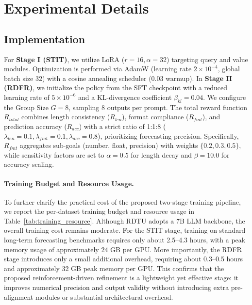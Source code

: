 \section{Experimental Details}\label{appx:implementation}

\subsection{Implementation}

For \textbf{Stage I (STIT)}, we utilize LoRA ($r=16, \alpha=32$) targeting query and value modules. Optimization is performed via AdamW (learning rate $2\times 10^{-4}$, global batch size 32) with a cosine annealing scheduler (0.03 warmup). In \textbf{Stage II (RDFR)}, we initialize the policy from the SFT checkpoint with a reduced learning rate of $5\times 10^{-6}$ and a KL-divergence coefficient $\beta_{kl}=0.04$. We configure the Group Size $G=8$, sampling 8 outputs per prompt. The total reward function $R_{total}$ combines length consistency ($R_{len}$), format compliance ($R_{fmt}$), and prediction accuracy ($R_{acc}$) with a strict ratio of 1:1:8 ($\lambda_{len}=0.1, \lambda_{fmt}=0.1, \lambda_{acc}=0.8$), prioritizing forecasting precision. Specifically, $R_{fmt}$ aggregates sub-goals (number, float, precision) with weights $\{0.2, 0.3, 0.5\}$, while sensitivity factors are set to $\alpha=0.5$ for length decay and $\beta=10.0$ for accuracy scaling.

\paragraph{Training Budget and Resource Usage.}
To further clarify the practical cost of the proposed two-stage training pipeline,
we report the per-dataset training budget and resource usage in Table~\ref{tab:training_resource}.
Although RDTU adopts a 7B LLM backbone, the overall training cost remains moderate.
For the STIT stage, training on standard long-term forecasting benchmarks requires only about 2.5--4.3 hours, with a peak memory usage of approximately 24 GB per GPU.
More importantly, the RDFR stage introduces only a small additional overhead, requiring about 0.3--0.5 hours and approximately 32 GB peak memory per GPU.
This confirms that the proposed reinforcement-driven refinement is a lightweight yet effective stage: it improves numerical precision and output validity without introducing extra pre-alignment modules or substantial architectural overhead.



